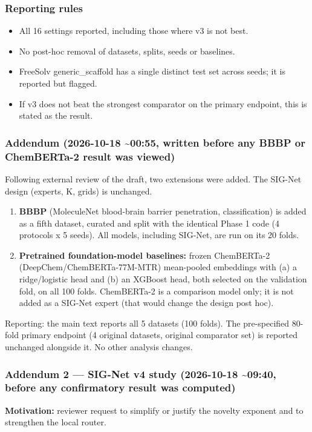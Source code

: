 \documentclass[11pt]{article}
\begin{document}
{\subsubsection*{Reporting rules}
\begin{itemize}[leftmargin=*,itemsep=1pt,topsep=2pt]
\item All 16 settings reported, including those where v3 is not best.
\item No post-hoc removal of datasets, splits, seeds or baselines.
\item FreeSolv generic\_scaffold has a single distinct test set across seeds; it is reported but flagged.
\item If v3 does not beat the strongest comparator on the primary endpoint, this is stated as the result.
\end{itemize}
\subsubsection*{Addendum (2026-10-18 \textasciitilde{}00:55, written before any BBBP or ChemBERTa-2 result was viewed)}
Following external review of the draft, two extensions were added. The SIG-Net design (experts, K, grids) is unchanged.

\begin{enumerate}[leftmargin=*,itemsep=1pt,topsep=2pt]
\item \textbf{BBBP} (MoleculeNet blood-brain barrier penetration, classification) is added as a fifth dataset, curated and split with the identical Phase 1 code (4 protocols x 5 seeds). All models, including SIG-Net, are run on its 20 folds.
\item \textbf{Pretrained foundation-model baselines:} frozen ChemBERTa-2 (DeepChem/ChemBERTa-77M-MTR) mean-pooled embeddings with (a) a ridge/logistic head and (b) an XGBoost head, both selected on the validation fold, on all 100 folds. ChemBERTa-2 is a comparison model only; it is not added as a SIG-Net expert (that would change the design post hoc).
\end{enumerate}
Reporting: the main text reports all 5 datasets (100 folds). The pre-specified 80-fold primary endpoint (4 original datasets, original comparator set) is reported unchanged alongside it. No other analysis changes.

\subsubsection*{Addendum 2 --- SIG-Net v4 study (2026-10-18 \textasciitilde{}09:40, before any confirmatory result was computed)}
\textbf{Motivation:} reviewer request to simplify or justify the novelty exponent and to strengthen the local router.

}
\end{document}
